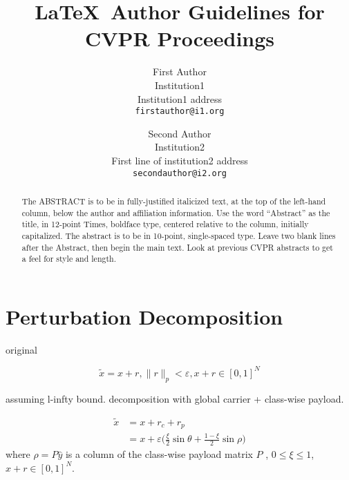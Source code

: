 \documentclass[review]{cvpr}
\begin{document}
\title{\LaTeX\ Author Guidelines for CVPR Proceedings}

\author{First Author\\
Institution1\\
Institution1 address\\
{\tt\small firstauthor@i1.org}
\and
Second Author\\
Institution2\\
First line of institution2 address\\
{\tt\small secondauthor@i2.org}
}

\maketitle


\begin{abstract}
   The ABSTRACT is to be in fully-justified italicized text, at the top
   of the left-hand column, below the author and affiliation
   information. Use the word ``Abstract'' as the title, in 12-point
   Times, boldface type, centered relative to the column, initially
   capitalized. The abstract is to be in 10-point, single-spaced type.
   Leave two blank lines after the Abstract, then begin the main text.
   Look at previous CVPR abstracts to get a feel for style and length.
\end{abstract}

\section{Perturbation Decomposition}

original

\[ \tilde{x} = x + r, \|r\|_p < \varepsilon, x+r \in [0,1]^N \]

assuming l-infty bound.
decomposition with global carrier + class-wise payload.

\begin{align}
	\tilde{x} &= x + r_c + r_p \\
	&= x + \varepsilon \Big(\frac{\xi}{2}\sin \theta + \frac{1-\xi}{2} \sin \rho \Big)
\end{align}
where $\rho = P\hat{y}$ is a column of the class-wise payload matrix $P$ , $0\leq \xi \leq 1$, $x+r\in [0,1]^N$.
\end{document}
